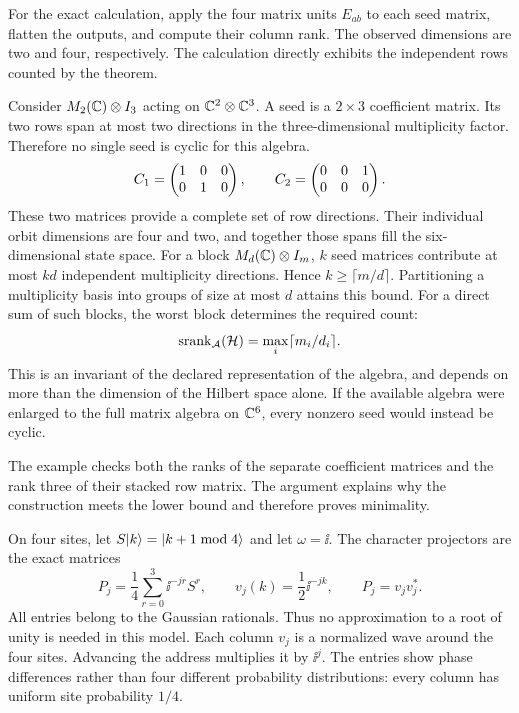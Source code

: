 For the exact calculation, apply the four matrix units $E_{ab}$ to each seed matrix, flatten the outputs, and compute their column rank. The observed dimensions are two and four, respectively. The calculation directly exhibits the independent rows counted by the theorem.

Consider $M_2(\CC)\otimes I_3$ acting on $\CC^2\otimes\CC^3$. A seed is a $2\times3$ coefficient matrix. Its two rows span at most two directions in the three-dimensional multiplicity factor. Therefore no single seed is cyclic for this algebra.
\[
C_1=\begin{pmatrix}1&0&0\\0&1&0\end{pmatrix},\qquad
C_2=\begin{pmatrix}0&0&1\\0&0&0\end{pmatrix}.
\]
These two matrices provide a complete set of row directions. Their individual orbit dimensions are four and two, and together those spans fill the six-dimensional state space.
For a block $M_d(\CC)\otimes I_m$, $k$ seed matrices contribute at most $kd$ independent multiplicity directions. Hence $k\ge\lceil m/d\rceil$. Partitioning a multiplicity basis into groups of size at most $d$ attains this bound. For a direct sum of such blocks, the worst block determines the required count:
\[
\operatorname{srank}_{\AA}(\HH)=\max_i\lceil m_i/d_i\rceil.
\]
This is an invariant of the declared representation of the algebra, and depends on more than the dimension of the Hilbert space alone. If the available algebra were enlarged to the full matrix algebra on $\CC^6$, every nonzero seed would instead be cyclic.

The example checks both the ranks of the separate coefficient matrices and the rank three of their stacked row matrix. The argument explains why the construction meets the lower bound and therefore proves minimality.

On four sites, let $S\lvert k\rangle=\lvert k+1\bmod4\rangle$ and let $\omega=\ii$. The character projectors are the exact matrices
\[
P_j=\frac14\sum_{r=0}^3\ii^{-jr}S^r,
\qquad v_j(k)=\frac12\ii^{-jk},\qquad P_j=v_jv_j^*.
\]
All entries belong to the Gaussian rationals. Thus no approximation to a root of unity is needed in this model.
Each column $v_j$ is a normalized wave around the four sites. Advancing the address multiplies it by $\ii^j$. The entries show phase differences rather than four different probability distributions: every column has uniform site probability $1/4$.

